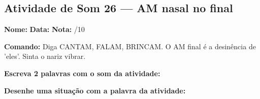 \subsection{Atividade de Som 26 --- AM nasal no final}
\begin{exercicio}



\noindent\textbf{Nome:} \underline{\hspace{3.2cm}} \quad \textbf{Data:} \underline{\hspace{1.6cm}} \quad \textbf{Nota:} \underline{\hspace{0.9cm}}/10


\noindent\textbf{Comando:} Diga CANTAM, FALAM, BRINCAM. O AM final é a desinência de 'eles'. Sinta o nariz vibrar.


\begin{center}
\end{center}

\noindent\textbf{Escreva 2 palavras com o som da atividade:}

\begin{center}
  \underline{\hspace{3cm}} \quad \underline{\hspace{3cm}}
\end{center}

\noindent\textbf{Desenhe uma situação com a palavra da atividade:}

\begin{center}
\end{center}

\end{exercicio}



